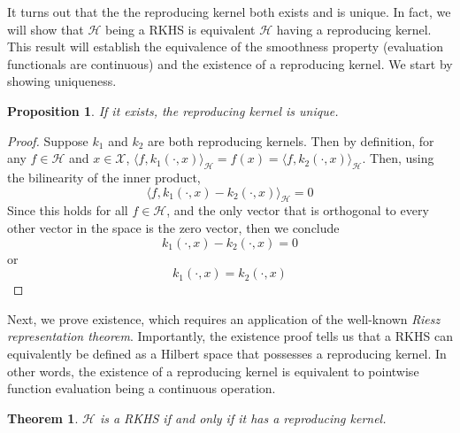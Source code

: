 \documentclass[12pt]{article}
\newtheorem{prop}{Proposition}
\newtheorem{thm}{Theorem}
\begin{document}
It turns out that the the reproducing kernel both exists and is unique. In fact, we will show that $\mathcal{H}$ being a RKHS is equivalent $\mathcal{H}$ having a reproducing kernel. This result will establish 
the equivalence of the smoothness property (evaluation functionals are continuous) and the existence of a reproducing kernel. We start by showing uniqueness. 
\begin{prop}
If it exists, the reproducing kernel is unique. 
\end{prop}
\begin{proof} 
Suppose $k_1$ and $k_2$ are both reproducing kernels. Then by definition, for any $f \in \mathcal{H}$ and $x \in \mathcal{X}$, 
$\langle f, k_1(\cdot, x)\rangle_{\mathcal{H}} = f(x) = \langle f, k_2(\cdot, x)\rangle_{\mathcal{H}}$. Then, using the bilinearity of the 
inner product,
\[\langle f, k_1(\cdot, x) - k_2(\cdot, x) \rangle_{\mathcal{H}} = 0\]
Since this holds for all $f \in \mathcal{H}$, and the only vector that is orthogonal to every other vector in the space is the zero vector, then we conclude
\[k_1(\cdot, x) - k_2(\cdot, x) = 0\]
or 
\[k_1(\cdot, x) = k_2(\cdot, x)\]

\end{proof}
 Next, we prove existence, which requires an application of the well-known \textit{Riesz representation theorem}. Importantly, the existence proof tells us that a RKHS can equivalently be defined as
 a Hilbert space that possesses a reproducing kernel. In other words, the existence of a reproducing kernel is equivalent to pointwise function evaluation being a continuous operation. 
 \begin{thm}
 $\mathcal{H}$ is a RKHS if and only if it has a reproducing kernel. 
 \end{thm}
\end{document}
